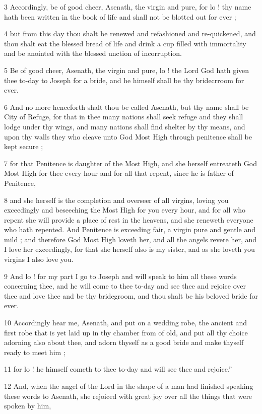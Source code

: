 3 Accordingly, be of good cheer, Asenath, the virgin and pure, for lo ! thy name hath been written in the book of life and shall not be blotted out for ever ; 

4 but from this day thou shalt be renewed and refashioned and re-quickened, and thou shalt eat the blessed bread of life and drink a cup filled with immortality and be anointed with the blessed unction of incorruption. 

5 Be of good cheer, Asenath, the virgin and pure, lo ! the Lord God hath given thee to-day to Joseph for a bride, and he himself shall be thy bridecrroom for ever. 

6 And no more henceforth shalt thou be called Asenath, but thy name shall be City of Refuge, for that in thee many nations shall seek refuge and they shall lodge under thy wings, and many nations shall find shelter by thy means, and upon thy walls they who cleave unto God Most High through penitence shall be kept secure ; 

7 for that Penitence is daughter of the Most High, and she herself entreateth God Most High for thee every hour and for all that repent, since he is father of Penitence, 

8 and she herself is the completion and overseer of all virgins, loving you exceedingly and beseeching the Most High for you every hour, and for all who repent she will provide a place of rest in the heavens, and she reneweth everyone who hath repented. And Penitence is exceeding fair, a virgin pure and gentle and mild ; and therefore God Most High loveth her, and all the angels revere her, and I love her exceedingly, for that she herself also is my sister, and as she loveth you virgins I also love you. 

9 And lo ! for my part I go to Joseph and will speak to him all these words concerning thee, and he will come to thee to-day and see thee and rejoice over thee and love thee and be thy bridegroom, and thou shalt be his beloved bride for ever. 

10 Accordingly hear me, Asenath, and put on a wedding robe, the ancient and first robe that is yet laid up in thy chamber from of old, and put all thy choice adorning also about thee, and adorn thyself as a good bride and make thyself ready to meet him ; 

11 for lo ! he himself cometh to thee to-day and will see thee and rejoice.” 

12 And, when the angel of the Lord in the shape of a man had finished speaking these words to Asenath, she rejoiced with great joy over all the things that were spoken by him, 

